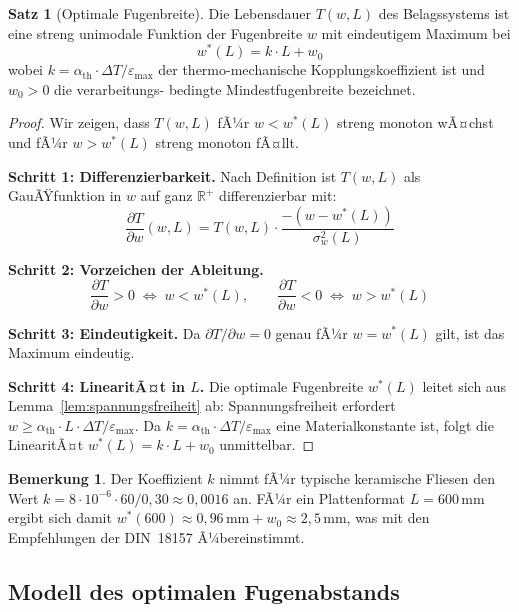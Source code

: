 ﻿\documentclass[a4paper,12pt]{article}
\theoremstyle{definition}
\newtheorem{satz}{Satz}
\newtheorem{bemerkung}{Bemerkung}
\begin{document}
\begin{satz}[Optimale Fugenbreite]
	\label{satz:optimum}
	Die Lebensdauer $T(w, L)$ des Belagssystems ist eine streng unimodale
	Funktion der Fugenbreite $w$ mit eindeutigem Maximum bei
	\[
	w^*(L) = k \cdot L + w_0
	\]
	wobei $k = \alpha_{\text{th}} \cdot \Delta T / \varepsilon_{\max}$ der
	thermo-mechanische Kopplungskoeffizient ist und $w_0 > 0$ die verarbeitungs-
	bedingte Mindestfugenbreite bezeichnet.
\end{satz}

\begin{proof}
	Wir zeigen, dass $T(w, L)$ fÃ¼r $w < w^*(L)$ streng monoton wÃ¤chst
	und fÃ¼r $w > w^*(L)$ streng monoton fÃ¤llt.

	\textbf{Schritt 1: Differenzierbarkeit.}
	Nach Definition ist $T(w, L)$ als GauÃŸfunktion in $w$ auf ganz
	$\mathbb{R}^+$ differenzierbar mit:
	\[
	\frac{\partial T}{\partial w}(w, L) = T(w, L) \cdot \frac{-(w - w^*(L))}{\sigma_w^2(L)}
	\]

	\textbf{Schritt 2: Vorzeichen der Ableitung.}
	\[
	\frac{\partial T}{\partial w} > 0 \;\Longleftrightarrow\; w < w^*(L), \qquad
	\frac{\partial T}{\partial w} < 0 \;\Longleftrightarrow\; w > w^*(L)
	\]

	\textbf{Schritt 3: Eindeutigkeit.}
	Da $\partial T/\partial w = 0$ genau fÃ¼r $w = w^*(L)$ gilt, ist das
	Maximum eindeutig.

	\textbf{Schritt 4: LinearitÃ¤t in $L$.}
	Die optimale Fugenbreite $w^*(L)$ leitet sich aus Lemma~\ref{lem:spannungsfreiheit}
	ab: Spannungsfreiheit erfordert $w \geq \alpha_{\text{th}} \cdot L \cdot \Delta T / \varepsilon_{\max}$.
	Da $k = \alpha_{\text{th}} \cdot \Delta T / \varepsilon_{\max}$ eine
	Materialkonstante ist, folgt die LinearitÃ¤t $w^*(L) = k \cdot L + w_0$
	unmittelbar.
\end{proof}

\begin{bemerkung}
	Der Koeffizient $k$ nimmt fÃ¼r typische keramische Fliesen den Wert
	$k = 8 \cdot 10^{-6} \cdot 60 / 0{,}30 \approx 0{,}0016$ an.
	FÃ¼r ein Plattenformat $L = 600\,\text{mm}$ ergibt sich damit
	$w^*(600) \approx 0{,}96\,\text{mm} + w_0 \approx 2{,}5\,\text{mm}$,
	was mit den Empfehlungen der DIN~18157 Ã¼bereinstimmt.
\end{bemerkung}

\subsection{Modell des optimalen Fugenabstands}
\end{document}
